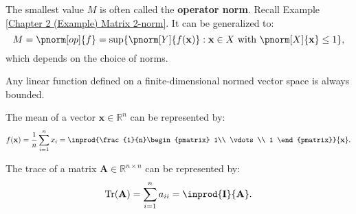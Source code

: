 \documentclass{huhtakm-template-book-v2}
\DeclareMathOperator{\Tr}{Tr}
\begin{document}
    \begin{rem}
        The smallest value $M$ is often called the \textbf{operator norm}. Recall Example \ref{Chapter 2 (Example) Matrix 2-norm}. It can be generalized to:
        \begin{equation*}
            M=\pnorm[op]{f}=\sup\{\pnorm[Y]{f(\mathbf{x})}:\mathbf{x}\in X \text{ with } \pnorm[X]{\mathbf{x}}\leq 1\},
        \end{equation*}
        which depends on the choice of norms.
    \end{rem}
    \begin{rem}
        Any linear function defined on a finite-dimensional normed vector space is always bounded.
    \end{rem}
    \begin{eg}
        The mean of a vector $\mathbf{x}\in\mathbb{R}^{n}$ can be represented by:
        \begin{equation*}
            f(\mathbf{x})=\frac{1}{n}\sum_{i=1}^{n}x_{i}=\inprod{\frac{1}{n}\begin{pmatrix}
                    1\\
                    \vdots\\
                    1
                \end{pmatrix}}{\mathbf{x}}.
        \end{equation*}
    \end{eg}
    \begin{eg}
        The trace of a matrix $\mathbf{A}\in\mathbb{R}^{n\times n}$ can be represented by:
        \begin{equation*}
            \Tr(\mathbf{A})=\sum_{i=1}^{n}a_{ii}=\inprod{\mathbf{I}}{\mathbf{A}}.
        \end{equation*}
    \end{eg}
    \newpage
\end{document}
